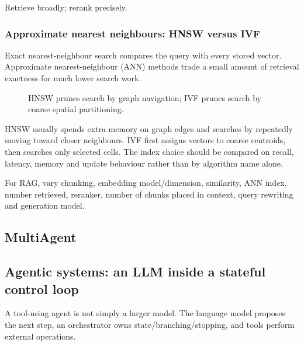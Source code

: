 \begin{calloutmemoryhook}
Retrieve broadly; rerank precisely.
\end{calloutmemoryhook}

\subsubsection{Approximate nearest neighbours: HNSW versus IVF}
\label{subsec:llms-ann}
Exact nearest-neighbour search compares the query with every stored vector.
Approximate nearest-neighbour (ANN) methods trade a small amount of retrieval exactness for much lower search work.

\begin{figure}[htbp]
\centering
{}
\caption{HNSW prunes search by graph navigation; IVF prunes search by coarse spatial partitioning.}
\end{figure}

HNSW usually spends extra memory on graph edges and searches by repeatedly moving toward closer neighbours.
IVF first assigns vectors to coarse centroids, then searches only selected cells.
The index choice should be compared on recall, latency, memory and update behaviour rather than by algorithm name alone.

\begin{calloutdegreeofexperiment}
For RAG, vary chunking, embedding model/dimension, similarity, ANN index, number retrieved, reranker, number of chunks placed in context, query rewriting and generation model.
\end{calloutdegreeofexperiment}

\subsection{MultiAgent}

\subsection{Agentic systems: an LLM inside a stateful control loop}
\label{sec:llms-agents}
A tool-using agent is not simply a larger model.
The language model proposes the next step, an orchestrator owns state/branching/stopping, and tools perform external operations.

